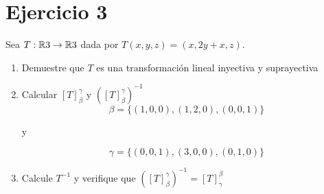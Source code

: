 \section*{Ejercicio 3}

Sea $T: \mathbb{R}{3} \rightarrow \mathbb{R}{3}$ dada por $T(x,y,z) = (x, 2y + x, z)$. 
\begin{enumerate}
    \item Demuestre que $T$ es una transformación lineal inyectiva y suprayectiva
    \item Calcular $\left[ T \right]_{\beta}^{\gamma}$ y $\left( \left[ T \right]_{\beta}^{\gamma} \right)^{-1}$
        \begin{equation*}
            \beta = \{ (1,0,0), (1,2,0), (0,0,1) \}
        \end{equation*}
    
        y 
    
        \begin{equation*}
            \gamma = \{ (0,0,1), (3,0,0), (0,1,0) \}
        \end{equation*}

    \item Calcule $T^{-1}$  y verifique que $\left( \left[ T \right]_{\beta}^{\gamma} \right)^{-1}  = \left[ T \right]_{\gamma}^{\beta}$ 
\end{enumerate}

